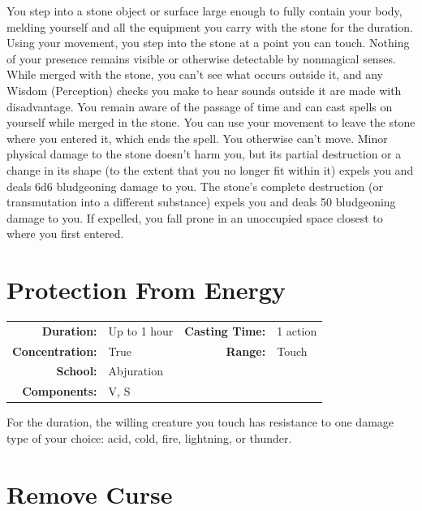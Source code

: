 \documentclass[12pt,showtrims]{memoir}
\begin{document}
\vspace{1\baselineskip}\noindent You step into a stone object or surface large enough to fully contain your body, melding yourself and all the equipment you carry with the stone for the duration. Using your movement, you step into the stone at a point you can touch. Nothing of your presence remains visible or otherwise detectable by nonmagical senses. While merged with the stone, you can't see what occurs outside it, and any Wisdom (Perception) checks you make to hear sounds outside it are made with disadvantage. You remain aware of the passage of time and can cast spells on yourself while merged in the stone. You can use your movement to leave the stone where you entered it, which ends the spell. You otherwise can't move. Minor physical damage to the stone doesn't harm you, but its partial destruction or a change in its shape (to the extent that you no longer fit within it) expels you and deals 6d6 bludgeoning damage to you. The stone's complete destruction (or transmutation into a different substance) expels you and deals 50 bludgeoning damage to you. If expelled, you fall prone in an unoccupied space closest to where you first entered.

\newpage
\section*{Protection From Energy}

{
\small\centering\vspace{-6pt}
\begin{tabular}{rlrl}
\toprule

\textbf{Duration:} & Up to 1 hour &
\textbf{Casting Time:} & 1 action \\
\textbf{Concentration:} & True &
\textbf{Range:} & Touch \\
\textbf{School:} & Abjuration \\
\textbf{Components:} & \multicolumn{3}{p{0.7\textwidth}}{V, S}\\

\bottomrule
\end{tabular}
}

\vspace{1\baselineskip}\noindent For the duration, the willing creature you touch has resistance to one damage type of your choice: acid, cold, fire, lightning, or thunder.

\newpage
\section*{Remove Curse}
\end{document}
